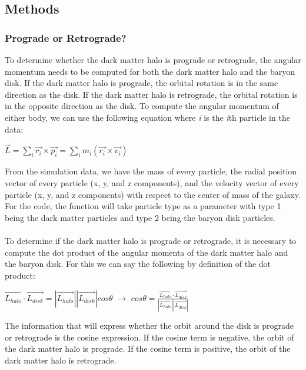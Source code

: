 \documentclass[linenumbers,trackchanges]{aastex7}
\begin{document}
\subsection{Methods}

\subsubsection{Prograde or Retrograde?} To determine whether the dark matter halo is prograde or retrograde, the angular momentum needs to be computed for both the dark matter halo and the baryon disk. If the dark matter halo is prograde, the orbital rotation is in the same direction as the disk. If the dark matter halo is retrograde, the orbital rotation is in the opposite direction as the disk. To compute the angular momentum of either body, we can use the following equation where \textit{i} is the \textit{i}th particle in the data:
\begin{center}
    $\vec{L} = \sum_{i} \vec{r_i} \times \vec{p_i} = \sum_{i} m_i (\vec{r_i} \times \vec{v_i})$
\end{center}
From the simulation data, we have the mass of every particle, the radial position vector of every particle (x, y, and z components), and the velocity vector of every particle (x, y, and z components) with respect to the center of mass of the galaxy. For the code, the function will take particle type as a parameter with type 1 being the dark matter particles and type 2 being the baryon disk particles.
\paragraph{} To determine if the dark matter halo is prograde or retrograde, it is necessary to compute the dot product of the angular momenta of the dark matter halo and the baryon disk. For this we can say the following by definition of the dot product:
\begin{center}
    $\vec{L_{halo}} \cdot \vec{L_{disk}} = |\vec{L_{halo}}||\vec{L_{disk}}|cos\theta$ $\rightarrow$ $cos\theta = \frac{\vec{L_{halo}} \cdot \vec{L_{disk}}}{|\vec{L_{halo}}||\vec{L_{disk}}|}$
\end{center}
The information that will express whether the orbit around the disk is prograde or retrograde is the cosine expression. If the cosine term is negative, the orbit of the dark matter halo is prograde. If the cosine term is positive, the orbit of the dark matter halo is retrograde.
\end{document}
